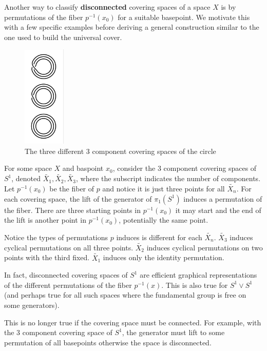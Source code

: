 \documentclass[10pt]{article}
\begin{document}
Another way to classify \textbf{disconnected} covering spaces of a space $X$
is by permutations of the fiber $p^{-1}(x_0)$ for a suitable basepoint. We
motivate this with a few specific examples before deriving a general construction
similar to the one used to build the universal cover.

\begin{figure}[ht!]
\centering
\includegraphics[width=20mm]{3-component-covering-spaces-of-s1.png}
\caption{The three different 3 component covering spaces of the circle}
\end{figure}

\begin{note}
	For some space $X$ and baspoint $x_0$, consider the 3 component covering
	spaces of $S^1$, denoted $\tilde{X_1}, \tilde{X_2}, \tilde{X_3}$, where the
	subscript indicates the number of components. Let $p^{-1}(x_0)$ be the fiber
	of $p$ and notice it is just three points for all $\tilde{X_n}$. For each
	covering space, the lift of the generator of $\pi_1(S^1)$ induces a
	permutation of the fiber. There are three starting points in $p^{-1}(x_0)$ it
	may start and the end of the lift is another point in $p^{-1}(x_0)$,
	potentially the same point.

	Notice the types of permutations $p$ induces is different for each
	$\tilde{X_n}$. $\tilde{X_3}$ induces cyclical permutations on all three points.
	$\tilde{X_2}$ induces cyclical permutations on two points with the third
	fixed. $\tilde{X_1}$ induces only the identity permutation.
\end{note}

In fact, disconnected covering spaces of $S^1$ are efficient graphical
representations of the different permutations of the fiber $p^{-1}(x)$.
This is also true for $S^1 \vee S^1$ (and perhaps true for all such spaces
where the fundamental group is free on some generators). 

This is no longer true if the covering space must be connected. For example,
with the 3 component covering space of $S^1$, the generator must lift to some
permutation of all basepoints otherwise the space is disconnected.
\end{document}
